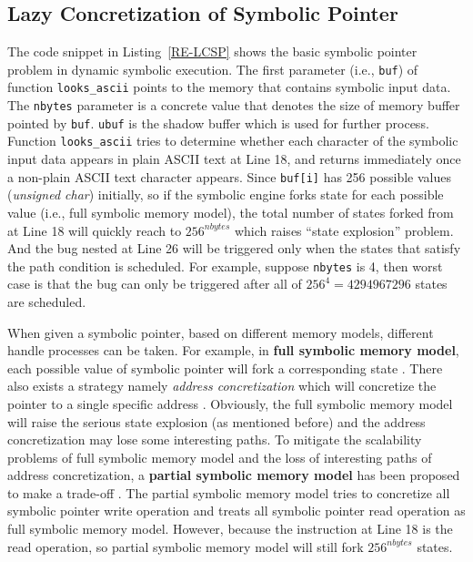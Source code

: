 \subsection{Lazy Concretization of Symbolic Pointer}
The code snippet in Listing~\ref{RE-LCSP} shows the basic symbolic pointer problem in dynamic symbolic execution. 
The first parameter (i.e., \texttt{buf}) of function \texttt{looks\_ascii} points to the memory that contains symbolic input data. The \texttt{nbytes} parameter is a concrete value that denotes the size of memory buffer pointed by \texttt{buf}. \texttt{ubuf} is the shadow buffer which is used for further process. 
Function \texttt{looks\_ascii} tries to determine whether each character of the symbolic input data appears in plain ASCII text at Line 18, and returns immediately once a non-plain ASCII text character appears. 
Since \texttt{buf[i]} has 256 possible values (\textit{unsigned char}) initially, so if the symbolic engine forks state for each possible value (i.e., full symbolic memory model), the total number of states forked from at Line 18 will quickly reach to $256^{nbytes}$ which raises ``state explosion'' problem. And the bug nested at Line 26 will be triggered only when the states that satisfy the path condition is scheduled. For example, suppose \texttt{nbytes} is 4, then worst case is that the bug can only be triggered after all of $256^4=4294967296$ states are scheduled.

When given a symbolic pointer, based on different memory models, different handle processes can be taken. For example, in \textbf{full symbolic memory model}, each possible value of symbolic pointer will fork a corresponding state \cite{song2008bitblaze, thakur2010directed, brumley2011bap, trtik2014symbolic}. There also exists a strategy namely \textit{address concretization} which will concretize the pointer to a single specific address \cite{godefroid2005dart, burnim2008heuristics}. Obviously, the full symbolic memory model will raise the serious state explosion (as mentioned before) and the address concretization may lose some interesting paths. To mitigate the scalability problems of full symbolic memory model and the loss of interesting paths of address concretization, a \textbf{partial symbolic memory model} has been proposed to make a trade-off \cite{cha2012unleashing, avgerinos2014exploiting, Shoshitaishvili_firmalice-automatic}. The partial symbolic memory model tries to concretize all symbolic pointer write operation and treats all symbolic pointer read operation as full symbolic memory model. However, because the instruction at Line 18 is the read operation, so partial symbolic memory model will still fork $256^{nbytes}$ states.

